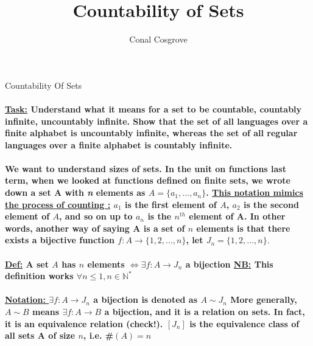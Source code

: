 \documentclass[10pt,a4paper]{article}
\author{Conal Cosgrove}
\begin{document}
\title{Countability of Sets}
\huge{Countability Of Sets}

\paragraph{\underline{Task:} Understand what it means for a set to be countable, countably infinite, uncountably infinite. Show that the set of all languages over a finite alphabet is uncountably infinite, whereas the set of all regular languages over a finite alphabet is countably infinite.}
\paragraph{We want to understand sizes of sets. In the unit on functions last term, when we looked at functions defined on finite sets, we wrote down a set A with \emph{n} elements as $A = \lbrace  a_{1},..., a_{n} \rbrace$. \newline
 \underline{This notation mimics the process of counting :}
 $a_{1} $ is the first element of $A$, $a_{2} $ is the second element of $A$, and so on up to $a_{n}$ is the $n^{th}$ element of A. In other words, another way of saying A is a set of $n$ elements is that there exists a bijective function $f : A \longrightarrow \lbrace 1,2,...,n \rbrace $, let $J_{n} = \lbrace 1,2,...,n\rbrace .$} 
 
 \paragraph{\underline{Def:} A set $A$ has $n$ elements $\iff \exists f : A \longrightarrow J_{n}$ a bijection \newline
 \underline{NB:} This definition works $\forall n \leq 1, n \in \mathbb{N}^{*}$ }
 


\paragraph{\underline{Notation: } $\exists  f : A \longrightarrow J_{n}$ a bijection is denoted as $A \sim J_{n}$ \newline
More generally, $A \sim B$ means $\exists f : A \longrightarrow B$ a bijection, and it is a relation on sets. In fact, it is an equivalence relation (check!). $\left[ J_{n}\right]$ is the equivalence class of all sets A of size $n$, i.e. \#$\left(A\right) = n$ }
\end{document}
